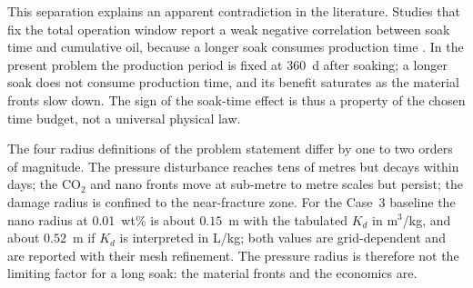 This separation explains an apparent contradiction in the literature. Studies
that fix the total operation window report a weak negative correlation between
soak time and cumulative oil, because a longer soak consumes production time
\cite{p1-03}. In the present problem the production period is fixed at 360~d
after soaking; a longer soak does not consume production time, and its benefit
saturates as the material fronts slow down. The sign of the soak-time effect is
thus a property of the chosen time budget, not a universal physical law.

The four radius definitions of the problem statement differ by one to two
orders of magnitude. The pressure disturbance reaches tens of metres but
decays within days; the CO$_2$ and nano fronts move at sub-metre to metre
scales but persist; the damage radius is confined to the near-fracture zone.
For the Case~3 baseline the nano radius at 0.01~wt\% is about $0.15$~m with
the tabulated $K_d$ in m$^3$/kg, and about $0.52$~m if $K_d$ is interpreted
in L/kg; both values are grid-dependent and are reported with their mesh
refinement. The pressure radius is therefore not the limiting factor for a
long soak: the material fronts and the economics are.
